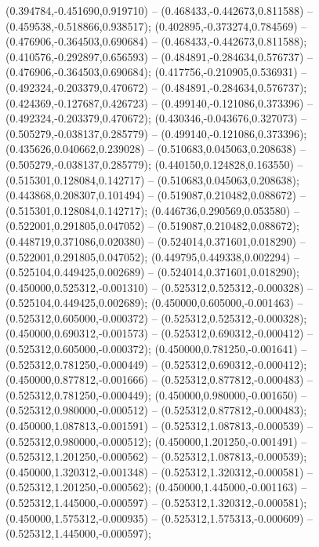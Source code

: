  (0.394784,-0.451690,0.919710) -- (0.468433,-0.442673,0.811588) -- (0.459538,-0.518866,0.938517);
 (0.402895,-0.373274,0.784569) -- (0.476906,-0.364503,0.690684) -- (0.468433,-0.442673,0.811588);
 (0.410576,-0.292897,0.656593) -- (0.484891,-0.284634,0.576737) -- (0.476906,-0.364503,0.690684);
 (0.417756,-0.210905,0.536931) -- (0.492324,-0.203379,0.470672) -- (0.484891,-0.284634,0.576737);
 (0.424369,-0.127687,0.426723) -- (0.499140,-0.121086,0.373396) -- (0.492324,-0.203379,0.470672);
 (0.430346,-0.043676,0.327073) -- (0.505279,-0.038137,0.285779) -- (0.499140,-0.121086,0.373396);
 (0.435626,0.040662,0.239028) -- (0.510683,0.045063,0.208638) -- (0.505279,-0.038137,0.285779);
 (0.440150,0.124828,0.163550) -- (0.515301,0.128084,0.142717) -- (0.510683,0.045063,0.208638);
 (0.443868,0.208307,0.101494) -- (0.519087,0.210482,0.088672) -- (0.515301,0.128084,0.142717);
 (0.446736,0.290569,0.053580) -- (0.522001,0.291805,0.047052) -- (0.519087,0.210482,0.088672);
 (0.448719,0.371086,0.020380) -- (0.524014,0.371601,0.018290) -- (0.522001,0.291805,0.047052);
 (0.449795,0.449338,0.002294) -- (0.525104,0.449425,0.002689) -- (0.524014,0.371601,0.018290);
 (0.450000,0.525312,-0.001310) -- (0.525312,0.525312,-0.000328) -- (0.525104,0.449425,0.002689);
 (0.450000,0.605000,-0.001463) -- (0.525312,0.605000,-0.000372) -- (0.525312,0.525312,-0.000328);
 (0.450000,0.690312,-0.001573) -- (0.525312,0.690312,-0.000412) -- (0.525312,0.605000,-0.000372);
 (0.450000,0.781250,-0.001641) -- (0.525312,0.781250,-0.000449) -- (0.525312,0.690312,-0.000412);
 (0.450000,0.877812,-0.001666) -- (0.525312,0.877812,-0.000483) -- (0.525312,0.781250,-0.000449);
 (0.450000,0.980000,-0.001650) -- (0.525312,0.980000,-0.000512) -- (0.525312,0.877812,-0.000483);
 (0.450000,1.087813,-0.001591) -- (0.525312,1.087813,-0.000539) -- (0.525312,0.980000,-0.000512);
 (0.450000,1.201250,-0.001491) -- (0.525312,1.201250,-0.000562) -- (0.525312,1.087813,-0.000539);
 (0.450000,1.320312,-0.001348) -- (0.525312,1.320312,-0.000581) -- (0.525312,1.201250,-0.000562);
 (0.450000,1.445000,-0.001163) -- (0.525312,1.445000,-0.000597) -- (0.525312,1.320312,-0.000581);
 (0.450000,1.575312,-0.000935) -- (0.525312,1.575313,-0.000609) -- (0.525312,1.445000,-0.000597);
